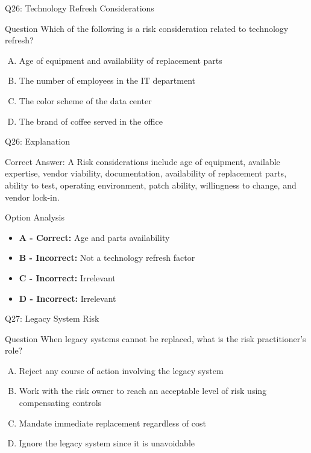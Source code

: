 \documentclass{beamer}
\begin{document}
	\begin{frame}{Q26: Technology Refresh Considerations}
		\begin{block}{Question}
			Which of the following is a risk consideration related to technology refresh?
		\end{block}
		\begin{enumerate}[(A)]
			\item Age of equipment and availability of replacement parts
			\item The number of employees in the IT department
			\item The color scheme of the data center
			\item The brand of coffee served in the office
		\end{enumerate}
	\end{frame}
	
	\begin{frame}{Q26: Explanation}
		\begin{block}{Correct Answer: A}
			Risk considerations include age of equipment, available expertise, vendor viability, documentation, availability of replacement parts, ability to test, operating environment, patch ability, willingness to change, and vendor lock-in.
		\end{block}
		\begin{block}{Option Analysis}
			\begin{itemize}
				\item \textbf{A - Correct:} Age and parts availability
				\item \textbf{B - Incorrect:} Not a technology refresh factor
				\item \textbf{C - Incorrect:} Irrelevant
				\item \textbf{D - Incorrect:} Irrelevant
			\end{itemize}
		\end{block}
	\end{frame}
	
	\begin{frame}{Q27: Legacy System Risk}
		\begin{block}{Question}
			When legacy systems cannot be replaced, what is the risk practitioner's role?
		\end{block}
		\begin{enumerate}[(A)]
			\item Reject any course of action involving the legacy system
			\item Work with the risk owner to reach an acceptable level of risk using compensating controls
			\item Mandate immediate replacement regardless of cost
			\item Ignore the legacy system since it is unavoidable
		\end{enumerate}
	\end{frame}
	
\end{document}
